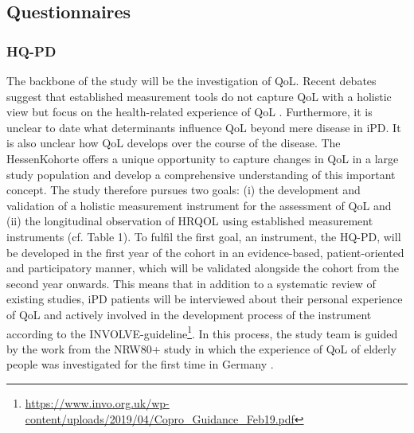 \subsection{Questionnaires}
\label{subsec:questionnaires}
\subsubsection{\acl{HQ-PD}}
\label{questionnaires:holy}
The backbone of the study will be the investigation of \ac{QoL}. Recent debates suggest that established measurement tools do not capture \ac{QoL} with a holistic view but focus on the health-related experience of \ac{QoL} \cite{stuhrenberg2022jpm,Karimi2016}. Furthermore, it is unclear to date what determinants influence \ac{QoL} beyond mere disease in \ac{iPD}. It is also unclear how \ac{QoL} develops over the course of the disease. The HessenKohorte offers a unique opportunity to capture changes in \ac{QoL} in a large study population and develop a comprehensive understanding of this important concept. The study therefore pursues two goals: (i) the development and validation of a holistic measurement instrument for the assessment of \ac{QoL} and (ii) the longitudinal observation of \ac{HRQOL} using established measurement instruments (cf. Table 1). 
To fulfil the first goal, an instrument, the \ac{HQ-PD}, will be developed in the first year of the cohort in an evidence-based, patient-oriented and participatory manner, which will be validated alongside the cohort from the second year onwards.  This means that in addition to a systematic review of existing studies, \ac{iPD} patients will be interviewed about their personal experience of \ac{QoL} and actively involved in the development process of the instrument according to the INVOLVE-guideline\footnote{\url{https://www.invo.org.uk/wp-content/uploads/2019/04/Copro_Guidance_Feb19.pdf}}. In this process, the study team is guided by the work from the NRW80+ study in which the experience of \ac{QoL} of elderly people was investigated for the first time in Germany \cite{wagner2017}.

